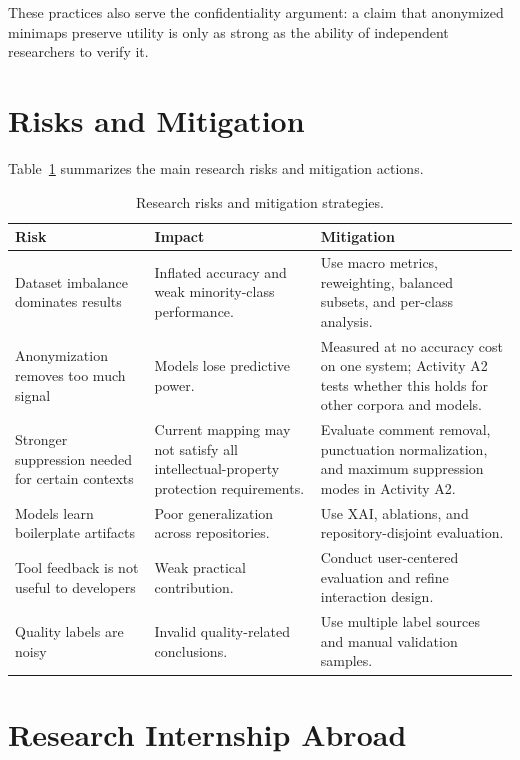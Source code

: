These practices also serve the confidentiality argument: a claim that
anonymized minimaps preserve utility is only as strong as the ability of
independent researchers to verify it.

\section{Risks and Mitigation}

Table~\ref{tab:risks} summarizes the main research risks and mitigation actions.

\begin{table}[ht]
\centering
\caption{Research risks and mitigation strategies.}
\label{tab:risks}
\begin{tabular}{p{}p{}p{}}
\toprule
\textbf{Risk} & \textbf{Impact} & \textbf{Mitigation} \\
\midrule
Dataset imbalance dominates results & Inflated accuracy and weak minority-class performance. & Use macro metrics, reweighting, balanced subsets, and per-class analysis. \\
Anonymization removes too much signal & Models lose predictive power. & Measured at no accuracy cost on one system; Activity A2 tests whether this holds for other corpora and models. \\
Stronger suppression needed for certain contexts & Current mapping may not satisfy all intellectual-property protection requirements. & Evaluate comment removal, punctuation normalization, and maximum suppression modes in Activity A2. \\
Models learn boilerplate artifacts & Poor generalization across repositories. & Use XAI, ablations, and repository-disjoint evaluation. \\
Tool feedback is not useful to developers & Weak practical contribution. & Conduct user-centered evaluation and refine interaction design. \\
Quality labels are noisy & Invalid quality-related conclusions. & Use multiple label sources and manual validation samples. \\
\bottomrule
\end{tabular}
\fautor
\end{table}

\section{Research Internship Abroad}
\label{sec:internship}

